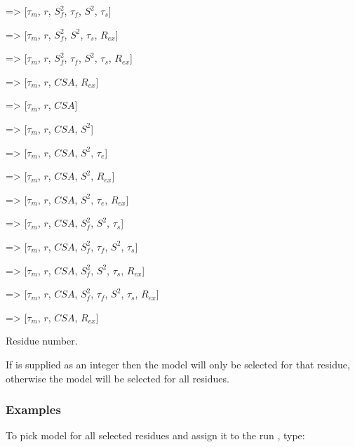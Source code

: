   => [$\tau_m$, $r$, $S^2_f$, $\tau_f$, $S^2$, $\tau_s$]
    
  => [$\tau_m$, $r$, $S^2_f$, $S^2$, $\tau_s$, $R_{ex}$]
    
  => [$\tau_m$, $r$, $S^2_f$, $\tau_f$, $S^2$, $\tau_s$, $R_{ex}$]
    
  => [$\tau_m$, $r$, $CSA$, $R_{ex}$]

    
  => [$\tau_m$, $r$, $CSA$]
    
  => [$\tau_m$, $r$, $CSA$, $S^2$]
    
  => [$\tau_m$, $r$, $CSA$, $S^2$, $\tau_e$]
    
  => [$\tau_m$, $r$, $CSA$, $S^2$, $R_{ex}$]
    
  => [$\tau_m$, $r$, $CSA$, $S^2$, $\tau_e$, $R_{ex}$]
    
  => [$\tau_m$, $r$, $CSA$, $S^2_f$, $S^2$, $\tau_s$]
    
  => [$\tau_m$, $r$, $CSA$, $S^2_f$, $\tau_f$, $S^2$, $\tau_s$]
    
  => [$\tau_m$, $r$, $CSA$, $S^2_f$, $S^2$, $\tau_s$, $R_{ex}$]
    
  => [$\tau_m$, $r$, $CSA$, $S^2_f$, $\tau_f$, $S^2$, $\tau_s$, $R_{ex}$]
    
  => [$\tau_m$, $r$, $CSA$, $R_{ex}$]



Residue number.

If 
 is supplied as an integer then the model will only be selected for that
residue, otherwise the model will be selected for all residues.



\subsubsection{Examples}

To pick model 
 for all selected residues and assign it to the run 
, type:





\newpage

